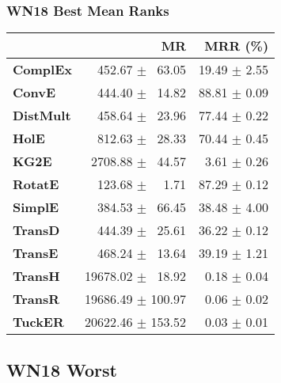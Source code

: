 \documentclass{article}
\begin{document}
\subsubsection{WN18 Best Mean Ranks}
    \begin{center}
    \begin{tabular}{lrr}
\toprule
{} &                 MR &      MRR (\%) \\
\midrule
\textbf{ComplEx } &  $\phantom{5}$$\phantom{5}$452.67 $\pm$ $\phantom{5}$63.05 &  19.49 $\pm$ 2.55 \\
\textbf{ConvE   } &  $\phantom{5}$$\phantom{5}$444.40 $\pm$ $\phantom{5}$14.82 &  88.81 $\pm$ 0.09 \\
\textbf{DistMult} &  $\phantom{5}$$\phantom{5}$458.64 $\pm$ $\phantom{5}$23.96 &  77.44 $\pm$ 0.22 \\
\textbf{HolE    } &  $\phantom{5}$$\phantom{5}$812.63 $\pm$ $\phantom{5}$28.33 &  70.44 $\pm$ 0.45 \\
\textbf{KG2E    } &  $\phantom{5}$2708.88 $\pm$ $\phantom{5}$44.57 &  $\phantom{5}$3.61 $\pm$ 0.26 \\
\textbf{RotatE  } &  $\phantom{5}$$\phantom{5}$123.68 $\pm$ $\phantom{5}$$\phantom{5}$1.71 &  87.29 $\pm$ 0.12 \\
\textbf{SimplE  } &  $\phantom{5}$$\phantom{5}$384.53 $\pm$ $\phantom{5}$66.45 &  38.48 $\pm$ 4.00 \\
\textbf{TransD  } &  $\phantom{5}$$\phantom{5}$444.39 $\pm$ $\phantom{5}$25.61 &  36.22 $\pm$ 0.12 \\
\textbf{TransE  } &  $\phantom{5}$$\phantom{5}$468.24 $\pm$ $\phantom{5}$13.64 &  39.19 $\pm$ 1.21 \\
\textbf{TransH  } &  19678.02 $\pm$ $\phantom{5}$18.92 &  $\phantom{5}$0.18 $\pm$ 0.04 \\
\textbf{TransR  } &  19686.49 $\pm$ 100.97 &  $\phantom{5}$0.06 $\pm$ 0.02 \\
\textbf{TuckER  } &  20622.46 $\pm$ 153.52 &  $\phantom{5}$0.03 $\pm$ 0.01 \\
\bottomrule
\end{tabular}

    \end{center}
\subsection{WN18 Worst}
\end{document}

